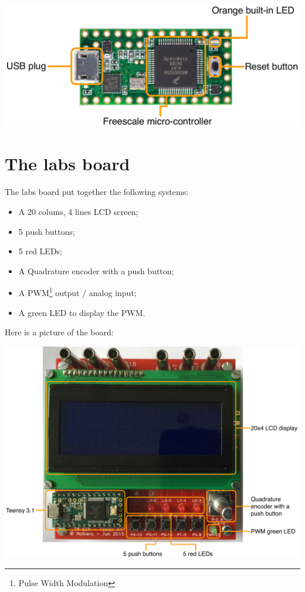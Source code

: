 \documentclass[11pt]{report}
\begin{document}
\begin{center}
   \includegraphics[scale=0.5]{teensy31.pdf}
\end{center}

\section{The labs board}

The labs board put together the following systems:
\begin{itemize}
\item A 20 colums, 4 lines LCD screen;
\item 5 push buttons;
\item 5 red LEDs;
\item A Quadrature encoder with a push button;
\item A PWM\footnote{Pulse Width Modulation} output / analog input;
\item A green LED to display the PWM.
\end{itemize}

Here is a picture of the board:

\begin{center}
\noindent\includegraphics[scale=0.45]{labsboard.pdf}
\end{center}
\end{document}
